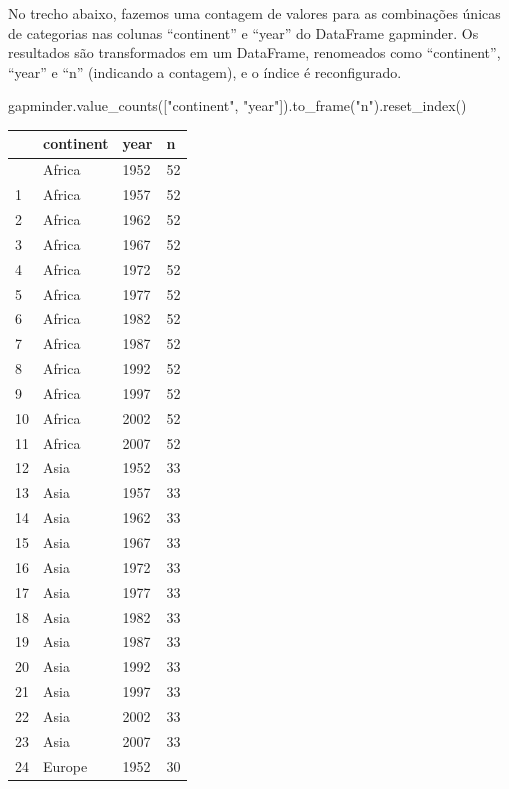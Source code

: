 \documentclass[
  portuguese,
  letterpaper,
  DIV=11,
  numbers=noendperiod]{scrreprt}
\newenvironment{Shaded}{\begin{snugshade}}{\end{snugshade}}
\newcommand{\NormalTok}[1]{\textcolor[rgb]{0.00,0.23,0.31}{#1}}
\newcommand{\StringTok}[1]{\textcolor[rgb]{0.13,0.47,0.30}{#1}}
\theoremstyle{definition}
\theoremstyle{remark}
\begin{document}
No trecho abaixo, fazemos uma contagem de valores para as combinações
únicas de categorias nas colunas ``continent'' e ``year'' do DataFrame
gapminder. Os resultados são transformados em um DataFrame, renomeados
como ``continent'', ``year'' e ``n'' (indicando a contagem), e o índice
é reconfigurado.

\begin{Shaded}
\begin{Highlighting}[]
\NormalTok{gapminder.value\_counts([}\StringTok{"continent"}\NormalTok{, }\StringTok{"year"}\NormalTok{]).to\_frame(}\StringTok{"n"}\NormalTok{).reset\_index()}
\end{Highlighting}
\end{Shaded}

\begin{longtable}[]{@{}llll@{}}
\toprule\noalign{}
& continent & year & n \\
\midrule\noalign{}
\endhead
\bottomrule\noalign{}
\endlastfoot
0 & Africa & 1952 & 52 \\
1 & Africa & 1957 & 52 \\
2 & Africa & 1962 & 52 \\
3 & Africa & 1967 & 52 \\
4 & Africa & 1972 & 52 \\
5 & Africa & 1977 & 52 \\
6 & Africa & 1982 & 52 \\
7 & Africa & 1987 & 52 \\
8 & Africa & 1992 & 52 \\
9 & Africa & 1997 & 52 \\
10 & Africa & 2002 & 52 \\
11 & Africa & 2007 & 52 \\
12 & Asia & 1952 & 33 \\
13 & Asia & 1957 & 33 \\
14 & Asia & 1962 & 33 \\
15 & Asia & 1967 & 33 \\
16 & Asia & 1972 & 33 \\
17 & Asia & 1977 & 33 \\
18 & Asia & 1982 & 33 \\
19 & Asia & 1987 & 33 \\
20 & Asia & 1992 & 33 \\
21 & Asia & 1997 & 33 \\
22 & Asia & 2002 & 33 \\
23 & Asia & 2007 & 33 \\
24 & Europe & 1952 & 30 \\

\end{longtable}
\end{document}
